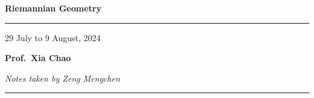 \documentclass[]{book}
\theoremstyle{definition}
\theoremstyle{plain}
\theoremstyle{remark}
\begin{document}
\frontmatter
\begin{titlepage}
    \vglue 5cm
    {\setlength{\parskip}{4pt}
    \par
    {\LARGE\bfseries\noindent Riemannian Geometry}}
    \vspace{2pt}
    \hrule depth4pt
    \begin{flushright}
        29 July to 9 August, 2024
    \end{flushright}
    \vfill
    {\setlength{\parskip}{4pt}
    \large{\bfseries Prof.\ Xia Chao}\par
    {\noindent\itshape Notes taken by Zeng Mengchen}}
    \vspace{2pt}
    \hrule depth2pt
\end{titlepage}


\tableofcontents
{}

\mainmatter









\appendix



\printindex
\end{document}
